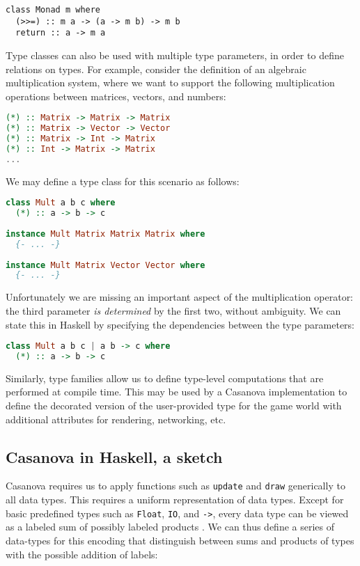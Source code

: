 \begin{lstlisting}
class Monad m where
  (>>=) :: m a -> (a -> m b) -> m b
  return :: a -> m a
\end{lstlisting}

Type classes can also be used with multiple type parameters, in order to define relations on types. For example, consider the definition of an algebraic multiplication system, where we want to support the following multiplication operations between matrices, vectors, and numbers:

\begin{lstlisting}[language=Haskell]
(*) :: Matrix -> Matrix -> Matrix
(*) :: Matrix -> Vector -> Vector
(*) :: Matrix -> Int -> Matrix
(*) :: Int -> Matrix -> Matrix
...
\end{lstlisting}

We may define a type class for this scenario as follows:

\begin{lstlisting}[language=Haskell]
class Mult a b c where
  (*) :: a -> b -> c
 
instance Mult Matrix Matrix Matrix where
  {- ... -}
 
instance Mult Matrix Vector Vector where
  {- ... -}
\end{lstlisting}

Unfortunately we are missing an important aspect of the multiplication operator: the third parameter \textit{is determined} by the first two, without ambiguity. We can state this in Haskell by specifying the dependencies between the type parameters:

\begin{lstlisting}[language=Haskell]
class Mult a b c | a b -> c where
  (*) :: a -> b -> c
\end{lstlisting}

Similarly, type families \cite{APPENDIX_E_TYPE_FAMILIES} allow us to define type-level computations that are performed at compile time. This may be used by a Casanova implementation to define the decorated version of the user-provided type for the game world with additional attributes for rendering, networking, etc.


\subsection{Casanova in Haskell, a sketch}

Casanova requires us to apply functions such as \texttt{update} and \texttt{draw} generically to all data types. This requires a uniform representation of data types. Except for basic predefined types such as \texttt{Float}, \texttt{IO}, and \texttt{->}, every data type can be viewed as a labeled sum of possibly labeled products \cite{APPENDIX_E_STRUCTURE_REPRESENTATION}. We can thus define a series of data-types for this encoding that distinguish between sums and products of types with the possible addition of labels:


